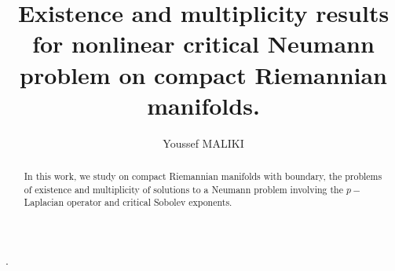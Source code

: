 \documentclass{Tran-l}
\theoremstyle{definition}
\theoremstyle{remark}
\numberwithin{equation}{section}
\begin{document}
\title[Nonlinear critical problem on compact manifolds]
{Existence and multiplicity results for nonlinear critical Neumann
problem on compact Riemannian manifolds.}
\author{ Youssef MALIKI }
\address{Department of Mathematics, Univesrity Aboubekr Belka\"{i}d of Tlemcen, ALgeria}
  .
\begin{abstract}
In this work, we study on compact Riemannian manifolds with
boundary, the problems of existence and multiplicity of solutions to
a Neumann problem involving the $p-$Laplacian operator and critical
Sobolev exponents.
\end{abstract}
\maketitle
\end{document}
